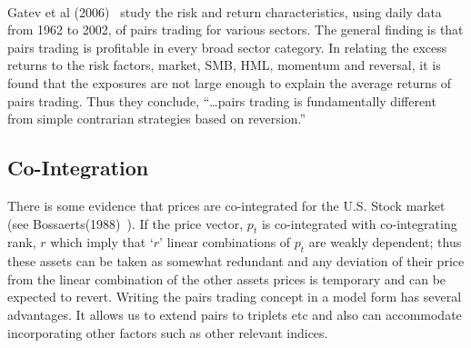 \noindent{} \\

Gatev et al (2006)~\cite{ggr} study the risk and return characteristics, using daily data from 1962 to 2002, of pairs trading for various sectors. The general finding is that pairs trading is profitable in every broad sector category. In relating the excess returns to the risk factors, market, SMB, HML, momentum and reversal, it is found that the exposures are not large enough to explain the average returns of pairs trading. Thus they conclude, ``\dots pairs trading is fundamentally different from simple contrarian strategies based on reversion.''


\subsection{Co-Integration}


There is some evidence that prices are co-integrated for the U.S. Stock market (see Bossaerts(1988)~\cite{bossaerts1988common}). If the price vector, $p_t$ is co-integrated with co-integrating rank, $r$ which imply that `$r$' linear combinations of $p_t$ are weakly dependent; thus these assets can be taken as somewhat redundant and any deviation of their price from the linear combination of the other assets prices is temporary and can be expected to revert. Writing the pairs trading concept in a model form has several advantages. It allows us to extend pairs to triplets etc and also can accommodate incorporating other factors such as other relevant indices.


